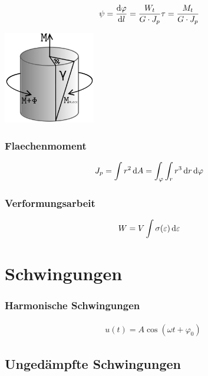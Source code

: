 \begin{multicols}{2}{}
\begin{align*}
\psi&=\frac{\mathop{}\!\mathrm{d} \varphi}{\mathop{}\!\mathrm{d} l}=\frac{W_t}{G\cdot J_p}\tau=\frac{M_t}{G\cdot J_p}
\end{align*}
\hfill

\begin{center}
 \includegraphics[width=40mm,height=40mm,keepaspectratio=true]{./Physik/Bilder/Scherbeanspruchung.png}
\end{center}
\end{multicols}


\begin{multicols}{2}{}
\subsubsection{Flaechenmoment}
\begin{align*}
J_p&=\int r^2\mathop{}\!\mathrm{d} A=\int_\varphi\int_r r^3\mathop{}\!\mathrm{d} r \mathop{}\!\mathrm{d} \varphi 
\end{align*}


\subsubsection{Verformungsarbeit}
\begin{align*}
W&=V\int \sigma(\varepsilon) \mathop{}\!\mathrm{d} \varepsilon 
\end{align*}
\end{multicols}


\section{Schwingungen}


\subsubsection{Harmonische Schwingungen}
\begin{align*}
u(t)=A\cos(\omega t+\varphi_0)
\end{align*}


\subsection{Ungedämpfte Schwingungen}

